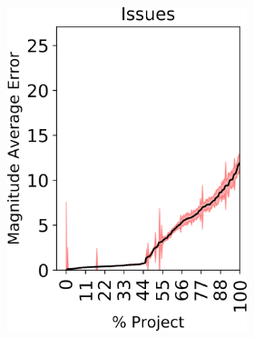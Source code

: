 \begin{figure}[tp!]
\begin{subfigure}[t]{\linewidth}
\begin{subfigure}[t]{0.33\linewidth}
		\includegraphics[width=\linewidth]{images/RQ1/opensrc/Issues.png}
	\end{subfigure}%
	~
	\centering
	\begin{subfigure}[t]{0.33\linewidth}
		\centering

\end{subfigure}
\end{subfigure}
\end{figure}
